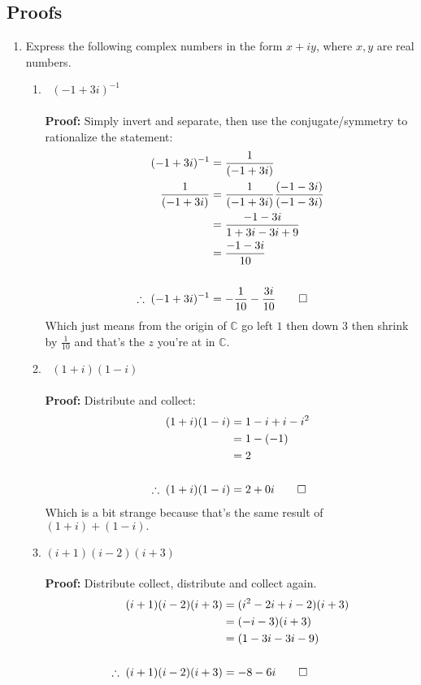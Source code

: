 \subsection{Proofs}
\begin{enumerate}
	\item Express the following complex numbers in the form $x + iy$, where $x, y$ are real numbers.
	\begin{enumerate}
		\item $\;\;(-1 + 3i)^{-1}$ \\
		\\
		\textbf{Proof:}	Simply invert and separate, then use the conjugate/symmetry to rationalize the statement:
		\begin{align*}
		(-1 + 3i)^{-1} &= \frac{1}{(-1 + 3i)} \\
		\frac{1}{(-1 + 3i)} &= \frac{1}{(-1 + 3i)}\frac{(-1 - 3i)}{(-1 - 3i)} \\
		&= \frac{-1 - 3i}{1 + 3i - 3i + 9} \\
		&= \frac{-1 - 3i}{10} \\
		\\
		\therefore \; (-1 + 3i)^{-1} &= -\frac{1}{10} - \frac{3i}{10} \qed
		\end{align*}
		Which just means from the origin of $\mathbb{C}$ go left $1$ then down $3$ then shrink by $\frac{1}{10}$ and that's the $z$ you're at in $\mathbb{C}.$
		
		\item $\;\;(1 + i)(1 - i)$ \\
		\\
		\textbf{Proof:} Distribute and collect:
		\begin{align*}
		(1 + i)(1 - i) &= 1 -i + i - i^2 \\
		&= 1 - (-1) \\
		&= 2 \\
		\\
		\therefore \; (1 + i)(1 - i) &= 2 + 0i \qed
		\end{align*}
		Which is a bit strange because that's the same result of $(1 + i) + ( 1 - i).$
		
		\item $(i + 1)(i - 2)(i + 3)$ \\
		\\
		\textbf{Proof:} Distribute collect, distribute and collect again.
		\begin{align*}
		(i + 1)(i - 2)(i + 3) &= (i^2 -2i + i - 2)(i + 3) \\
		&= (-i - 3)(i + 3) \\
		&= (1 - 3i - 3i - 9) \\
		\\
		\therefore \; (i + 1)(i - 2)(i + 3) &= -8 - 6i \qed
		\end{align*}
	\end{enumerate}
	

\end{enumerate}
